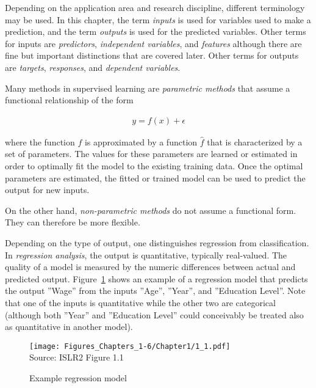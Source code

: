 Depending on the application area and research discipline, different terminology may be used. In this chapter, the term \emph{inputs} is used for variables used to make a prediction, and the term \emph{outputs} is used for the predicted variables. Other terms for inputs are \emph{predictors}, \emph{independent variables}, and \emph{features} although there are fine but important distinctions that are covered later. Other terms for outputs are \emph{targets}, \emph{responses}, and \emph{dependent variables}.

Many methods in supervised learning are \emph{parametric methods} that assume a functional relationship of the form 

\begin{align*}
y = f(x) + \epsilon
\end{align*}

\noindent where the function $f$ is approximated by a function $\hat{f}$ that is characterized by a set of parameters. The values for these parameters are learned or estimated in order to optimally fit the model to the existing training data. Once the optimal parameters are estimated, the fitted or trained model can be used to predict the output for new inputs.

On the other hand, \emph{non-parametric methods} do not assume a functional form. They can therefore be more flexible. 

Depending on the type of output, one distinguishes regression from classification. In \emph{regression analysis}, the output is quantitative, typically real-valued. The quality of a model is measured by the numeric differences between actual and predicted output. Figure~\ref{fig:regression_chap11} shows an example of a regression model that predicts the output ''Wage'' from the inputs ''Age'', ''Year'', and ''Education Level''. Note that one of the inputs is quantitative while the other two are categorical (although both ''Year'' and ''Education Level'' could conceivably be treated also as quantitative in another model).

\begin{figure}
\centering
\texttt{[image: Figures\_Chapters\_1-6/Chapter1/1\_1.pdf]} \\
\scriptsize Source: ISLR2 Figure 1.1
\caption{Example regression model}
\label{fig:regression_chap11}
\end{figure}


